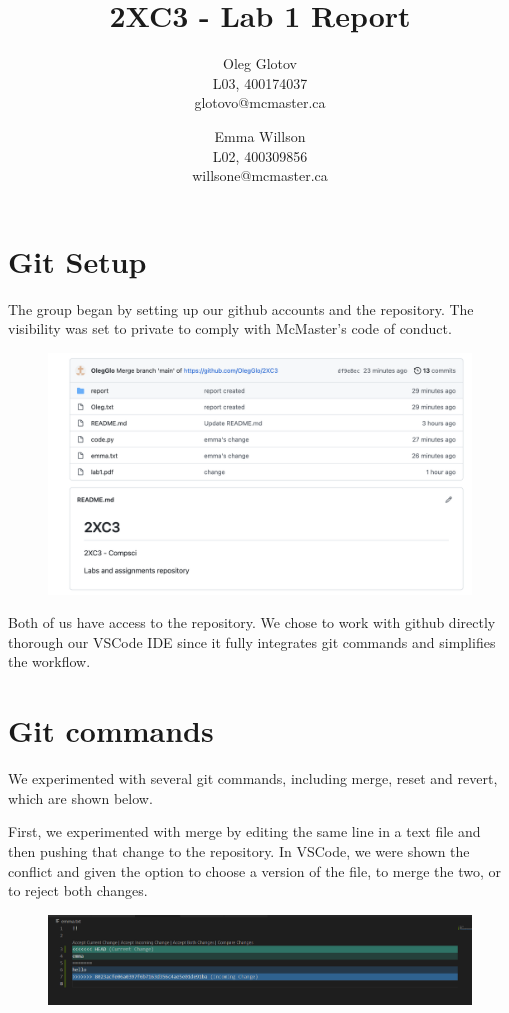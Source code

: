\documentclass[twocolumn, 10pt]{article}
\title{2XC3 - Lab 1 Report}
\author{Oleg Glotov\\ L03, 400174037\\ glotovo@mcmaster.ca \and Emma Willson\\ L02, 400309856\\ willsone@mcmaster.ca}
\begin{document}
\maketitle
\section{Git Setup}\label{sec:git}
The group began by setting up our github accounts and the repository. The visibility was set to private to comply with McMaster's code of conduct.

\begin{figure}[H]
\includegraphics[width=\linewidth]{img1}
\end{figure}

Both of us have access to the repository. We chose to work with github directly thorough our VSCode IDE since it fully integrates git commands and simplifies the workflow.

\section{Git commands}

We experimented with several git commands, including merge, reset and revert, which are shown below. 

First, we experimented with merge by editing the same line in a text file and then pushing that change to the repository. In VSCode, we were shown the conflict and given the option to choose a version of the file, to merge the two, or to reject both changes.

\begin{figure}[H]
\includegraphics[width=\linewidth]{merge}
\end{figure}
\end{document}
